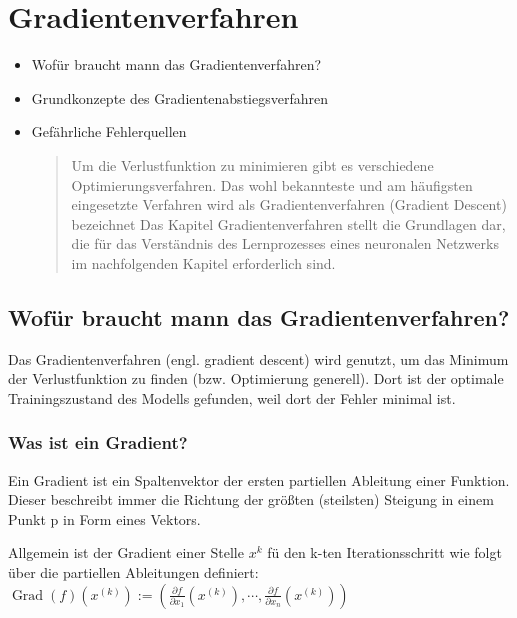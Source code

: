 \newpage
\thispagestyle{empty}
\section{Gradientenverfahren}\label{sec:gradientenverfahren}   
\begin{tcolorbox}[title={Inhalte des \textit{Gradientenverfahren}}]
  \begin{itemize}
    \item Wofür braucht mann das Gradientenverfahren?
    \item Grundkonzepte des Gradientenabstiegsverfahren
    \item Gefährliche Fehlerquellen
  \begin{quotation}\noindent
    Um die Verlustfunktion zu minimieren gibt es verschiedene Optimierungsverfahren. Das wohl bekannteste und am häufigsten eingesetzte Verfahren wird als Gradientenverfahren (Gradient Descent) bezeichnet
    Das Kapitel Gradientenverfahren stellt die Grundlagen dar, die für das Verständnis des Lernprozesses eines neuronalen Netzwerks im nachfolgenden Kapitel erforderlich sind.
  \end{quotation}
  \end{itemize}
\end{tcolorbox}


\subsection{Wofür braucht mann das Gradientenverfahren?}\label{subsec:gradientenverfahren:wofuer}
Das Gradientenverfahren (engl. gradient descent) wird genutzt, um das Minimum der Verlustfunktion zu finden (bzw. Optimierung generell). Dort ist der optimale Trainingszustand des Modells gefunden, weil dort der Fehler minimal ist.


\subsubsection{Was ist ein Gradient?}\label{subsec:gradientenverfahren:was_ist_gradient}
  Ein Gradient ist ein Spaltenvektor der ersten partiellen Ableitung einer Funktion. 
  Dieser beschreibt immer die Richtung der größten (steilsten) Steigung in einem Punkt p in Form eines Vektors.\cite{JH20}

  Allgemein ist der Gradient einer Stelle $x^k$ fü den k-ten  Iterationsschritt wie folgt über die partiellen Ableitungen definiert:
  $\operatorname{Grad}(f)(x^{(k)}) := \left(\frac{\partial f}{\partial x_{1}}(x^{(k)}), \cdots, \frac{\partial f}{\partial x_{n}}(x^{(k)})\right)$

